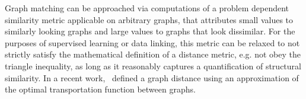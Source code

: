 Graph matching can be approached via computations of a problem dependent similarity metric applicable on arbitrary graphs, that attributes small values to similarly looking graphs and large values to graphs that look dissimilar. For the purposes of supervised learning or data linking, this metric can be relaxed to not strictly satisfy the mathematical definition of a distance metric, e.g. not obey the triangle inequality, as long as it reasonably captures a quantification of structural similarity. In a recent work,~\textcite{chowdhury19} defined a graph distance using an approximation of the optimal transportation function between graphs.
